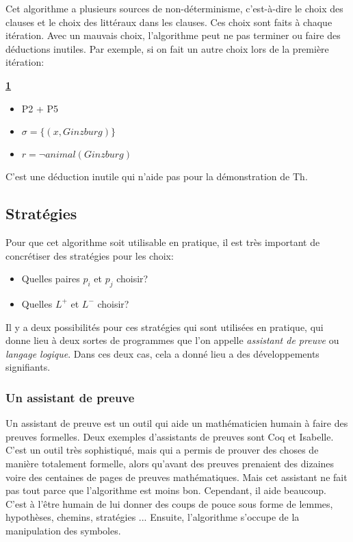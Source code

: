 {Cet algorithme a plusieurs sources de non-déterminisme, c'est-à-dire
le choix des clauses et le choix des littéraux dans les clauses.
Ces choix sont faits à chaque itération.
Avec un mauvais choix, l'algorithme peut ne pas terminer ou
faire des déductions inutiles.
Par exemple, si on fait un autre choix lors de la première itération:

\textbf{\underline{1}}
\begin{itemize}
  \item P2 + P5
  \item $\sigma = \big\{ (x, Ginzburg) \big\}$
  \item $r = \neg animal(Ginzburg)$
\end{itemize}

C'est une déduction inutile qui n'aide pas pour la démonstration de $\mathrm{Th}$.

\subsection{Stratégies}

Pour que cet algorithme soit utilisable en pratique, il est très important
de concrétiser des stratégies pour les choix:
\begin{itemize}
  \item Quelles paires $p_i$ et $p_j$ choisir?
  \item Quelles $L^{+}$ et $L^{-}$ choisir?
\end{itemize}
Il y a deux possibilités pour ces stratégies qui sont utilisées en pratique,
qui donne lieu à deux sortes de programmes que l'on appelle {\em assistant de preuve}
ou {\em langage logique}.
Dans ces deux cas, cela a donné lieu a des développements signifiants.

\subsubsection{Un assistant de preuve}

Un assistant de preuve est un outil qui aide un mathématicien humain à faire des preuves formelles.
Deux exemples d'assistants de preuves sont Coq et Isabelle. C'est un outil très sophistiqué, mais qui a permis de prouver des choses de manière totalement formelle, alors qu'avant des preuves prenaient des dizaines voire des centaines de pages de preuves mathématiques. Mais cet assistant ne fait pas tout parce que l'algorithme est moins bon. Cependant, il aide beaucoup. C'est à l'être humain de lui donner des coups de pouce sous forme de lemmes, hypothèses, chemins, stratégies ... Ensuite, l'algorithme s'occupe de la manipulation des symboles.

}
